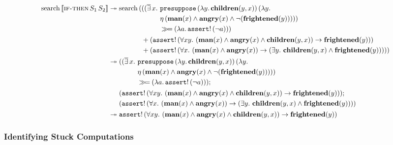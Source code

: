 \begin{align*}
  \operatorname{search}\,\llbracket \textsc{if-then}\,S_1\,S_2 \rrbracket
  &\twoheadrightarrow \operatorname{search}\,(\begin{aligned}[t]
     &((\mathop{\overline{\exists}} x.\ \begin{aligned}[t]
         &\mathtt{presuppose}\,(\lambda y.\, \textbf{children}(y, x))\,(\lambda y.\,  \\
         &\eta\,(\textbf{man}(x) \land \textbf{angry}(x) \land \lnot (\textbf{frightened}(y))))) \\
         &\mathbin{\gg\!=} (\lambda a.\, \mathtt{assert}!\,(\lnot a))) \\
       \end{aligned} \\
     &+ (\mathtt{assert}!\,(\forall x y.\ (\textbf{man}(x) \land \textbf{angry}(x) \land
                          \textbf{children}(y, x)) \to \textbf{frightened}(y))) \\
     &+ (\mathtt{assert}!\,(\forall x.\ (\textbf{man}(x) \land \textbf{angry}(x)) \to (\exists y.\ \textbf{children}(y, x) \land \textbf{frightened}(y)))))
   \end{aligned} \\
  &\twoheadrightarrow \begin{aligned}[t]
     &((\mathop{\overline{\exists}} x.\ \begin{aligned}[t]
         &\mathtt{presuppose}\,(\lambda y.\, \textbf{children}(y, x))\,(\lambda y.\,  \\
         &\eta\,(\textbf{man}(x) \land \textbf{angry}(x) \land \lnot (\textbf{frightened}(y))))) \\
         &\mathbin{\gg\!=} (\lambda a.\, \mathtt{assert}!\,(\lnot a))); \\
       \end{aligned} \\
     &(\mathtt{assert}!\,(\forall x y.\ (\textbf{man}(x) \land \textbf{angry}(x) \land
                        \textbf{children}(y, x)) \to \textbf{frightened}(y))); \\
     &(\mathtt{assert}!\,(\forall x.\ (\textbf{man}(x) \land \textbf{angry}(x)) \to (\exists y.\ \textbf{children}(y, x) \land \textbf{frightened}(y))))
   \end{aligned} \\
  &\twoheadrightarrow \mathtt{assert}!\,(\forall x y.\ (\textbf{man}(x) \land \textbf{angry}(x) \land
                           \textbf{children}(y, x)) \to \textbf{frightened}(y))
\end{align*}


\subsubsection{Identifying Stuck Computations}

